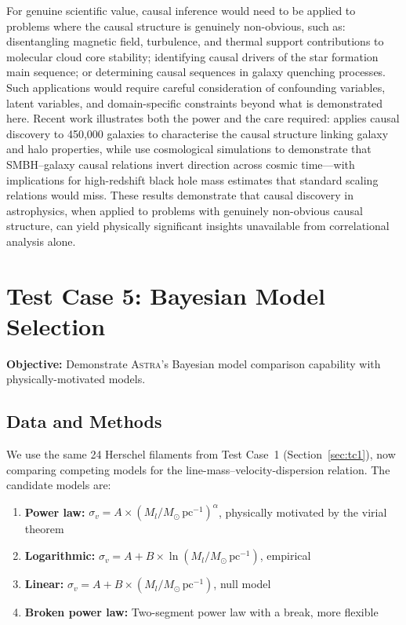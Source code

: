 \documentclass[usenatbib]{rasti}
\newcommand{\astra}{\textsc{Astra}\xspace}
\begin{document}
For genuine scientific value, causal inference would need to be applied to problems where the causal structure is genuinely non-obvious, such as: disentangling magnetic field, turbulence, and thermal support contributions to molecular cloud core stability; identifying causal drivers of the star formation main sequence; or determining causal sequences in galaxy quenching processes.
Such applications would require careful consideration of confounding variables, latent variables, and domain-specific constraints beyond what is demonstrated here.
Recent work illustrates both the power and the care required: \citet{Desmond2026} applies causal discovery to 450,000 galaxies to characterise the causal structure linking galaxy and halo properties, while \citet{Davis2026} use cosmological simulations to demonstrate that SMBH--galaxy causal relations invert direction across cosmic time---with implications for high-redshift black hole mass estimates that standard scaling relations would miss.
These results demonstrate that causal discovery in astrophysics, when applied to problems with genuinely non-obvious causal structure, can yield physically significant insights unavailable from correlational analysis alone.

\section{Test Case 5: Bayesian Model Selection}
\label{sec:tc5}

\textbf{Objective:} Demonstrate \astra's Bayesian model comparison capability with physically-motivated models.

\subsection{Data and Methods}
\label{sec:tc5:data}

We use the same 24 Herschel filaments from Test Case~1 (Section~\ref{sec:tc1}), now comparing competing models for the line-mass--velocity-dispersion relation.
The candidate models are:
\begin{enumerate}
  \item[(i)] \textbf{Power law:} $\sigma_v = A \times (M_l/M_\odot\,\mathrm{pc}^{-1})^{\alpha}$, physically motivated by the virial theorem
  \item[(ii)] \textbf{Logarithmic:} $\sigma_v = A + B \times \ln(M_l/M_\odot\,\mathrm{pc}^{-1})$, empirical
  \item[(iii)] \textbf{Linear:} $\sigma_v = A + B \times (M_l/M_\odot\,\mathrm{pc}^{-1})$, null model
  \item[(iv)] \textbf{Broken power law:} Two-segment power law with a break, more flexible
\end{enumerate}
\end{document}
